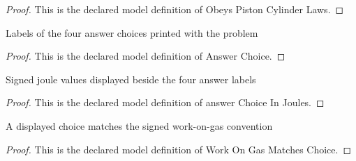 \begin{proof}
  This is the declared model definition of Obeys Piston Cylinder Laws.
\end{proof}
\begin{definition}
  \label{def:physics:phyx-mini-0407:phyxminiproblems-problemphyxmini0407-answerchoice}
  Labels of the four answer choices printed with the problem
\end{definition}
\begin{proof}
  This is the declared model definition of Answer Choice.
\end{proof}
\begin{definition}
  \label{def:physics:phyx-mini-0407:phyxminiproblems-problemphyxmini0407-answerchoiceinjoules}
  Signed joule values displayed beside the four answer labels
\end{definition}
\begin{proof}
  This is the declared model definition of answer Choice In Joules.
\end{proof}
\begin{definition}
  \label{def:physics:phyx-mini-0407:phyxminiproblems-problemphyxmini0407-workongasmatcheschoice}
  A displayed choice matches the signed work-on-gas convention
\end{definition}
\begin{proof}
  This is the declared model definition of Work On Gas Matches Choice.
\end{proof}
